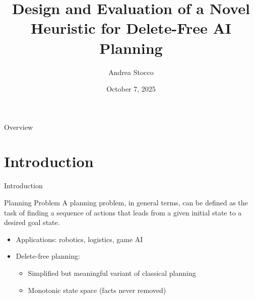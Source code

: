 \documentclass[aspectratio=169,xcolor=dvipsnames]{beamer}
\title{Design and Evaluation of a Novel Heuristic for Delete-Free AI Planning}
\author{Andrea Stocco}
\institute
{
    Department of Information Engineering \\
    University of Padova %
}
\date{October 7, 2025} %
\begin{document}
{
\begin{frame}
	\titlepage
\end{frame}
}

\begin{frame}{Overview}
	\tableofcontents
\end{frame}

\section{Introduction}

\begin{frame}{Introduction}
	\begin{block}{Planning Problem}
		A planning problem, in general terms, can be defined as the task of finding a sequence
		of actions that leads from a given initial state to a desired goal state.
	\end{block}
	\begin{itemize}
		\item Applications: robotics, logistics, game AI
		\item Delete-free planning:
		      \begin{itemize}
			      \item Simplified but meaningful variant of classical planning
			      \item Monotonic state space (facts never removed)
		      \end{itemize}
	\end{itemize}
\end{frame}
\end{document}
